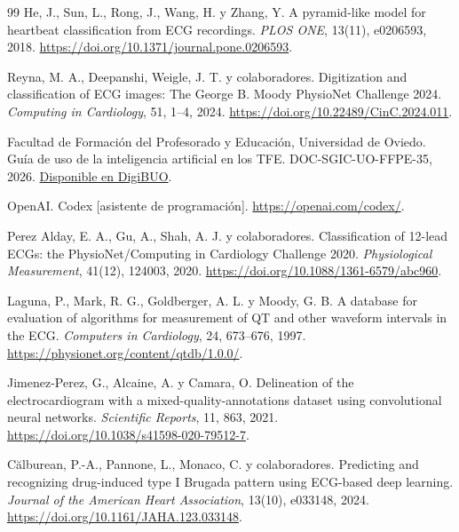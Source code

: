\begin{thebibliography}{99}
He, J., Sun, L., Rong, J., Wang, H. y Zhang, Y.
\newblock A pyramid-like model for heartbeat classification from ECG recordings.
\newblock \emph{PLOS ONE}, 13(11), e0206593, 2018.
\newblock \url{https://doi.org/10.1371/journal.pone.0206593}.

Reyna, M. A., Deepanshi, Weigle, J. T. y colaboradores.
\newblock Digitization and classification of ECG images: The George B. Moody PhysioNet Challenge 2024.
\newblock \emph{Computing in Cardiology}, 51, 1--4, 2024.
\newblock \url{https://doi.org/10.22489/CinC.2024.011}.

Facultad de Formación del Profesorado y Educación, Universidad de Oviedo.
\newblock Guía de uso de la inteligencia artificial en los TFE. DOC-SGIC-UO-FFPE-35, 2026.
\newblock \href{https://digibuo.uniovi.es/dspace/bitstream/handle/10651/83693/Guia_IA_TFE.pdf?sequence=1\&isAllowed=y}{Disponible en DigiBUO}.

OpenAI.
\newblock Codex [asistente de programación].
\newblock \url{https://openai.com/codex/}.

Perez Alday, E. A., Gu, A., Shah, A. J. y colaboradores.
\newblock Classification of 12-lead ECGs: the PhysioNet/Computing in Cardiology Challenge 2020.
\newblock \emph{Physiological Measurement}, 41(12), 124003, 2020.
\newblock \url{https://doi.org/10.1088/1361-6579/abc960}.

Laguna, P., Mark, R. G., Goldberger, A. L. y Moody, G. B.
\newblock A database for evaluation of algorithms for measurement of QT and other waveform intervals in the ECG.
\newblock \emph{Computers in Cardiology}, 24, 673--676, 1997.
\newblock \url{https://physionet.org/content/qtdb/1.0.0/}.

Jimenez-Perez, G., Alcaine, A. y Camara, O.
\newblock Delineation of the electrocardiogram with a mixed-quality-annotations dataset using convolutional neural networks.
\newblock \emph{Scientific Reports}, 11, 863, 2021.
\newblock \url{https://doi.org/10.1038/s41598-020-79512-7}.

Călburean, P.-A., Pannone, L., Monaco, C. y colaboradores.
\newblock Predicting and recognizing drug-induced type I Brugada pattern using ECG-based deep learning.
\newblock \emph{Journal of the American Heart Association}, 13(10), e033148, 2024.
\newblock \url{https://doi.org/10.1161/JAHA.123.033148}.


\end{thebibliography}
